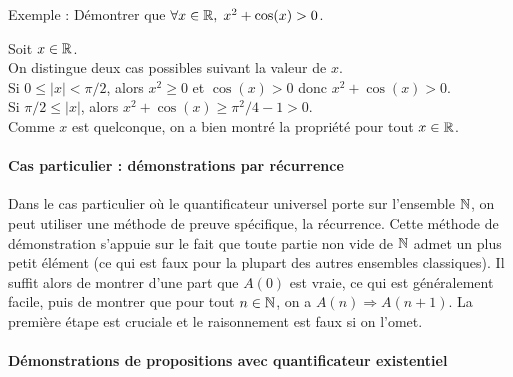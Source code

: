 {Exemple : Démontrer que $\forall x\in\mathbb{R},\; x^2+\cos(x)>0$.\\
\begin{red} Soit $x\in\mathbb{R}$.\\
On distingue deux cas possibles suivant la valeur de $x$.\\
Si $0\leq |x|< \pi/2$, alors $x^2\geq 0$ et $\cos(x)> 0$ donc $x^2+\cos(x)>0$.\\
Si  $\pi/2\leq|x|$, alors $x^2+\cos(x)\geq \pi^2/4-1>0$.\\
Comme $x$ est quelconque, on a bien montré la propriété pour tout $x\in\mathbb{R}$.\end{red}

\paragraph{Cas particulier : démonstrations par récurrence}
Dans le cas particulier où le quantificateur universel porte sur l'ensemble $\mathbb{N}$, on peut utiliser une méthode de preuve spécifique, la récurrence. Cette méthode de démonstration s'appuie sur le fait que toute partie non vide de $\mathbb{N}$ admet un plus petit élément (ce qui est faux pour la plupart des autres ensembles classiques). Il suffit alors de montrer d'une part que $A(0)$ est vraie, ce qui est généralement facile, puis de montrer que pour tout $n \in\mathbb{N}$, on a $A(n) \Rightarrow A(n+1)$. La première étape est cruciale et le raisonnement est faux si on l'omet.


\paragraph{Démonstrations de propositions avec quantificateur existentiel}$ $\\

}
